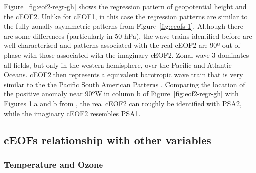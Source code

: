 \documentclass[smallextended]{svjour3}       %
\begin{document}
Figure~\ref{fig:eof2-regr-gh} shows the regression pattern of geopotential height and the cEOF2. Unlike for cEOF1, in this case the regression patterns are similar to the fully zonally asymmetric patterns from Figure~\ref{fig:ceofs-1}. Although there are some differences (particularly in 50 hPa), the wave trains identified before are well characterised and patterns associated with the real cEOF2 are 90º out of phase with those associated with the imaginary cEOF2. Zonal wave 3 dominates all fields, but only in the western hemisphere, over the Pacific and Atlantic Oceans. cEOF2 then represents a equivalent barotropic wave train that is very similar to the the Pacific South American Patterns \citep{mo2001}. Comparing the location of the positive anomaly near 90ºW in column b of Figure~\ref{fig:eof2-regr-gh} with Figures 1.a and b from \citet{mo2001}, the real cEOF2 can roughly be identified with PSA2, while the imaginary cEOF2 resembles PSA1.

\hypertarget{ceofs-relationship-with-other-variables}{%
\subsection{cEOFs relationship with other variables}\label{ceofs-relationship-with-other-variables}}

\hypertarget{temperature-and-ozone}{%
\subsubsection{Temperature and Ozone}\label{temperature-and-ozone}}
\end{document}
